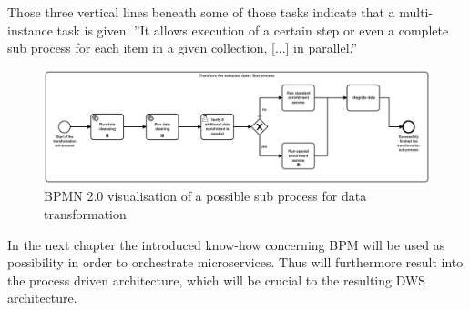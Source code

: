 Those three vertical lines beneath some of those tasks indicate that a multi-instance task is given. ''It allows execution of a certain step or even a complete sub process for each item in a given collection, [...] in parallel.'' \cite{bpmMultiInstance} \newline
\begin{figure}[!htb]
    \centering
    \includegraphics[scale=0.13]{pictures/DataTransformationSubprocess.png}
    \caption{BPMN 2.0 visualisation of a possible sub process for data transformation}
    \label{fig:BPMNdatatransformation}
\end{figure}

In the next chapter the introduced know-how concerning BPM will be used as possibility in order to orchestrate microservices. Thus will furthermore result into the process driven architecture, which will be crucial to the resulting DWS architecture.

